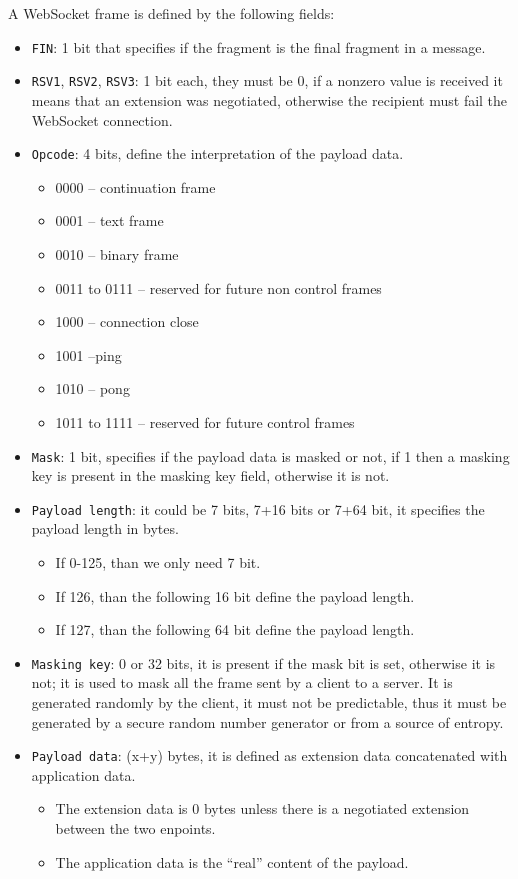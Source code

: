 A WebSocket frame is defined by the following fields:
\begin{itemize}
	\item \texttt{FIN}: 1 bit that specifies if the fragment is the final fragment in a message.
	\item \texttt{RSV1}, \texttt{RSV2}, \texttt{RSV3}: 1 bit each, they must be 0, if a nonzero value is received it means that an extension was negotiated, otherwise the recipient must fail the WebSocket connection.
	\item \texttt{Opcode}: 4 bits, define the interpretation of the payload data.
	\begin{itemize}
		\item 0000 – continuation frame
		\item 0001 – text frame
		\item 0010 – binary frame
		\item 0011 to 0111 – reserved for future non control frames
		\item 1000 – connection close
		\item 1001 –ping
		\item 1010 – pong
		\item 1011 to 1111 – reserved for future control frames
	\end{itemize}
	\item \texttt{Mask}: 1 bit, specifies if the payload data is masked or not, if 1 then a masking key is present in the masking key field, otherwise it is not.
	\item \texttt{Payload length}: it could be 7 bits, 7+16 bits or 7+64 bit, it specifies the payload length in bytes.
	\begin{itemize}
		\item If 0-125, than we only need 7 bit.
		\item If 126, than the following 16 bit define the payload length.
		\item If 127, than the following 64 bit define the payload length.
	\end{itemize}
	\item \texttt{Masking key}: 0 or 32 bits, it is present if the mask bit is set, otherwise it is not; it is used to mask all the frame sent by a client to a server.
	It is generated randomly by the client, it must not be predictable, thus it must be generated by a secure random number generator or from a source of entropy.
	\item \texttt{Payload data}: (x+y) bytes, it is defined as extension data concatenated with application data.
	\begin{itemize}
		\item The extension data is 0 bytes unless there is a negotiated extension between the two enpoints.
		\item The application data is the “real” content of the payload.
	\end{itemize}
\end{itemize}


